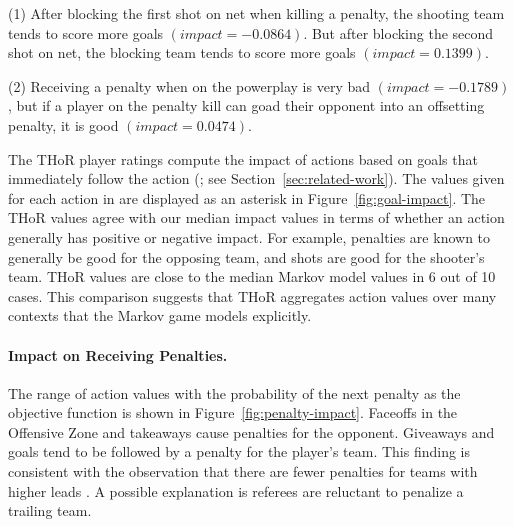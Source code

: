 \documentclass[]{article}
\begin{document}
 (1) After blocking the first shot on net when killing a penalty, the shooting team tends to score more goals $(impact=-0.0864)$. But after blocking the second shot on net, the blocking team tends to score more goals $(impact=0.1399)$.

 (2) Receiving a penalty when on the powerplay is very bad $(impact=-0.1789)$, but if a player on the penalty kill can goad their opponent into an offsetting penalty, it is good $(impact=0.0474)$.

The THoR player ratings compute the impact of actions based on goals that immediately follow the action (\citep{Lock2009,Schuckers2011}; see Section~\ref{sec:related-work}).
The values given for each action in \citep{Lock2009} are displayed as an asterisk in Figure~\ref{fig:goal-impact}.
%
The THoR values
agree with our median impact values in terms of whether an action generally has positive or negative impact. For example, penalties are known to generally be good for the opposing team, and shots are good for the shooter's team. THoR values are close to the median Markov model values in 6 out of 10 cases.
This comparison suggests that THoR aggregates action values over many contexts that the Markov game models explicitly.



\paragraph{Impact on Receiving Penalties.}
The range of action values with the probability of the next penalty as the objective function is shown in Figure~\ref{fig:penalty-impact}.
Faceoffs in the Offensive Zone and takeaways cause penalties for the opponent. Giveaways and goals tend to be followed by a penalty for the player's team. This finding is consistent with the observation that there are fewer penalties for teams with higher leads \citep{Schuckers2012}. A possible explanation is referees are reluctant to penalize a trailing team.
\end{document}
